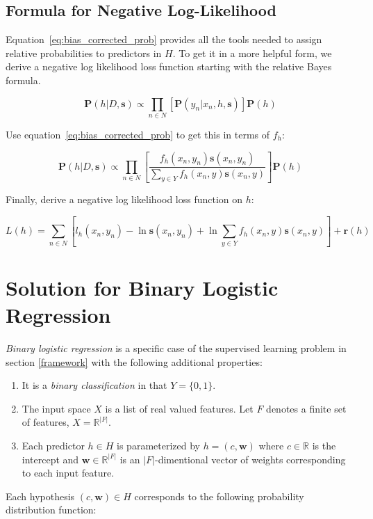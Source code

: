\documentclass[twoside]{article}
\begin{document}
\subsection{Formula for Negative Log-Likelihood}

Equation~\eqref{eq:bias_corrected_prob} provides all the tools needed to assign relative probabilities to predictors in \(H\). To get it in a more helpful form, we derive a negative log likelihood loss function starting with the relative Bayes formula.

\[\mathbf{P}(h|D,\mathbf{s})\propto\prod_{n \in N} \left[\mathbf{P}(y_n|x_n,h,\mathbf{s})\right]\mathbf{P}(h)\]

Use equation~\eqref{eq:bias_corrected_prob} to get this in terms of \(f_h\):

\[\mathbf{P}(h|D,\mathbf{s})\propto\prod_{n \in N} \left[\frac{f_h(x_n,y_n)\mathbf{s}(x_n,y_n)}{\sum_{y \in Y}f_h(x_n,y)\mathbf{s}(x_n,y)}\right]\mathbf{P}(h)\]

Finally, derive a negative log likelihood loss function on \(h\):

\[L(h)= \sum_{n \in N} \left[l_h(x_n,y_n)-\ln\mathbf{s}(x_n,y_n)+\ln\sum_{y \in Y}f_h(x_n,y)\mathbf{s}(x_n,y) \right] +\mathbf{r}(h)\]

\section{Solution for Binary Logistic Regression}
\label{section:logistic}

\textit{Binary logistic regression} is a specific case of the supervised learning problem in section \ref{framework} with the following additional properties:

\begin{enumerate}
	\item It is a \textit{binary classification} in that \(Y = \{0, 1\}\).
	\item The input space \(X\) is a list of real valued features. Let \(F\) denotes a finite set of features, \(X = \mathbb{R} ^{|F|}\).
	\item Each predictor \(h \in H\) is parameterized by \(h = (c, \mathbf{w})\) where \(c \in \mathbb{R}\) is the intercept and \(\mathbf{w} \in \mathbb{R}^{|F|}\) is an \(|F|\)-dimentional vector of weights corresponding to each input feature.
\end{enumerate}

Each hypothesis \((c, \mathbf{w}) \in H\) corresponds to the following probability distribution function:
\end{document}
